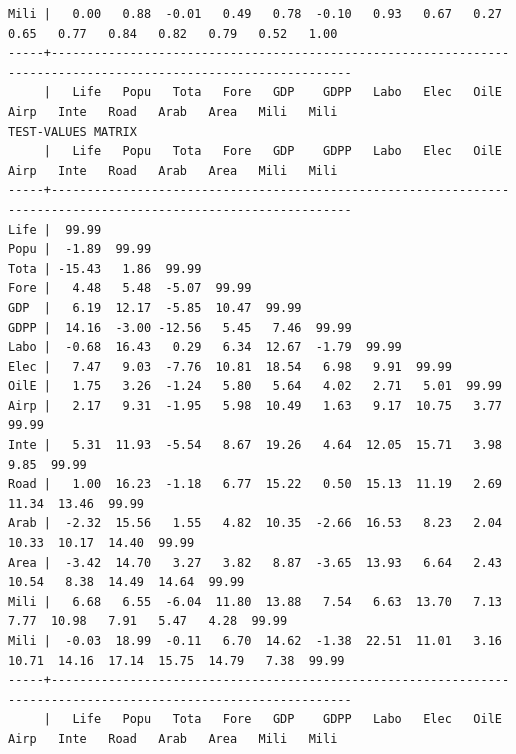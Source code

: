 \documentclass[a4paper,10pt,twocolumn]{article}
\begin{document}
\begin{landscape}
\begin{verbatim}
Mili |   0.00   0.88  -0.01   0.49   0.78  -0.10   0.93   0.67   0.27   0.65   0.77   0.84   0.82   0.79   0.52   1.00
-----+----------------------------------------------------------------------------------------------------------------
     |   Life   Popu   Tota   Fore   GDP    GDPP   Labo   Elec   OilE   Airp   Inte   Road   Arab   Area   Mili   Mili
TEST-VALUES MATRIX
     |   Life   Popu   Tota   Fore   GDP    GDPP   Labo   Elec   OilE   Airp   Inte   Road   Arab   Area   Mili   Mili
-----+----------------------------------------------------------------------------------------------------------------
Life |  99.99
Popu |  -1.89  99.99
Tota | -15.43   1.86  99.99
Fore |   4.48   5.48  -5.07  99.99
GDP  |   6.19  12.17  -5.85  10.47  99.99
GDPP |  14.16  -3.00 -12.56   5.45   7.46  99.99
Labo |  -0.68  16.43   0.29   6.34  12.67  -1.79  99.99
Elec |   7.47   9.03  -7.76  10.81  18.54   6.98   9.91  99.99
OilE |   1.75   3.26  -1.24   5.80   5.64   4.02   2.71   5.01  99.99
Airp |   2.17   9.31  -1.95   5.98  10.49   1.63   9.17  10.75   3.77  99.99
Inte |   5.31  11.93  -5.54   8.67  19.26   4.64  12.05  15.71   3.98   9.85  99.99
Road |   1.00  16.23  -1.18   6.77  15.22   0.50  15.13  11.19   2.69  11.34  13.46  99.99
Arab |  -2.32  15.56   1.55   4.82  10.35  -2.66  16.53   8.23   2.04  10.33  10.17  14.40  99.99
Area |  -3.42  14.70   3.27   3.82   8.87  -3.65  13.93   6.64   2.43  10.54   8.38  14.49  14.64  99.99
Mili |   6.68   6.55  -6.04  11.80  13.88   7.54   6.63  13.70   7.13   7.77  10.98   7.91   5.47   4.28  99.99
Mili |  -0.03  18.99  -0.11   6.70  14.62  -1.38  22.51  11.01   3.16  10.71  14.16  17.14  15.75  14.79   7.38  99.99
-----+----------------------------------------------------------------------------------------------------------------
     |   Life   Popu   Tota   Fore   GDP    GDPP   Labo   Elec   OilE   Airp   Inte   Road   Arab   Area   Mili   Mili


\end{verbatim}
\end{landscape}
\end{document}
